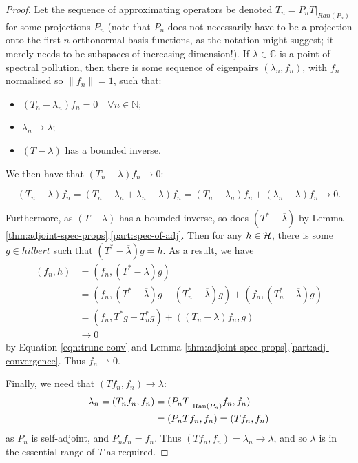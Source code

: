\documentclass[../main.tex]{subfiles}
\begin{document}
\begin{proof}
Let the sequence of approximating operators be denoted $T_n = P_n
T\big|_{Ran(P_n)}$ for some projections $P_n$ (note that $P_n$ does not
necessarily have to be a projection onto the first $n$ orthonormal basis
functions, as the notation might suggest; it merely needs to be
subspaces of increasing dimension!). If $\lambda \in \mathbb{C}$ is a
point of spectral pollution, then there is some sequence of eigenpairs
$(\lambda_n, f_n)$, with $f_n$ normalised so $\|f_n\| = 1$, such that:
\begin{itemize}
  \item $(T_n - \lambda_n)f_n =0 \quad \forall n \in \mathbb{N}$;
  \item $\lambda_n \rightarrow \lambda$;
  \item $(T - \lambda)$ has a bounded inverse.
\end{itemize}
We then have that $(T_n - \lambda)f_n \rightarrow 0$:

\begin{equation}
\label{eqn:trunc-conv}
(T_n - \lambda)f_n = (T_n - \lambda_n + \lambda_n - \lambda)f_n 
		   = (T_n -\lambda_n)f_n + (\lambda_n - \lambda)f_n 
		   \rightarrow 0. 
\end{equation}

Furthermore, as $(T - \lambda)$ has a bounded inverse, so does $(T^* -
\overline{\lambda})$ by Lemma
\ref{thm:adjoint-spec-props}.\ref{part:spec-of-adj}. Then for any $h \in
\mathcal{H}$, there is some $g \in hilbert$ such that $(T^* - \overline{\lambda})g = h$.
As a result, we have
\begin{align*}
(f_n, h) & = (f_n, (T^* - \overline{\lambda})g) \\
& = (f_n, (T^* - \overline{\lambda})g - (T_n^* - \overline{\lambda})g) + (f_n, (T_n^* - \overline{\lambda})g) \\
& = (f_n, T^*g - T_n^*g) + ((T_n - \lambda)f_n, g) \\
& \rightarrow 0
\end{align*}
by Equation \ref{eqn:trunc-conv} and Lemma
\ref{thm:adjoint-spec-props}.\ref{part:adj-convergence}. Thus 
$f_n \rightharpoonup 0$.

Finally, we need that $(T f_n, f_n) \rightarrow \lambda$:
\begin{align*}
\lambda_n = (T_n f_n, f_n) & = (P_n T\big|_{\mathrm{Ran}(P_n)} f_n, f_n)  \\
& = (P_n T f_n, f_n) = (T f_n, f_n)
\end{align*}
as $P_n$ is self-adjoint, and $P_n f_n = f_n$. Thus $(T f_n, f_n) = \lambda_n
\rightarrow \lambda$, and so $\lambda$ is in the essential range of $T$ as
required. \end{proof}
\end{document}
